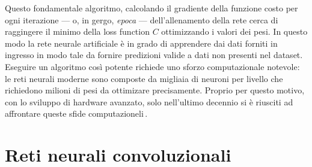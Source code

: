 \noindent Questo fondamentale algoritmo, calcolando il gradiente della funzione costo per ogni iterazione — o, in gergo, \textsl{epoca} — dell'allenamento della rete cerca di raggingere il minimo della loss function $C$ ottimizzando i valori dei pesi. In questo modo la rete neurale artificiale è in grado di apprendere dai dati forniti in ingresso in modo tale da fornire predizioni valide a dati non presenti nel dataset. Eseguire un algoritmo così potente richiede uno sforzo computazionale notevole: le reti neurali moderne sono composte da migliaia di neuroni per livello che richiedono milioni di pesi da ottimizare precisamente. Proprio per questo motivo, con lo sviluppo di hardware avanzato, solo nell'ultimo decennio si è riusciti ad affrontare queste sfide computazioneli\,\cite{flasinski2016introduction, rojas1996backpropagation, nielsen2015neural, aggarwal2018neural}.


\section{Reti neurali convoluzionali}
% 


\begin{comment}
    Per non diventare matti la notazione è l'opposta di quella sul file di Machine Learnign.
    - ci sono esattamente N feature in un vettore di input, di conseguenza il vettore di pesi è di lunghezza N
    - ci sono esattamente M vettori di input nel dataset, di conseguenza la lunghezza della label è M
    - Il dataset D è composta da j colonne ed i righe
    - Ciascuna riga j rappresenta un elemento del dataset
    - Ciascuna colonna i rappresente un feature del dataset
    
    Di conseguneza D_j indica il vettore j-esimo composto esattamente da N componenti. La label y_j indica il vero valore dell'input processato
\end{comment}



